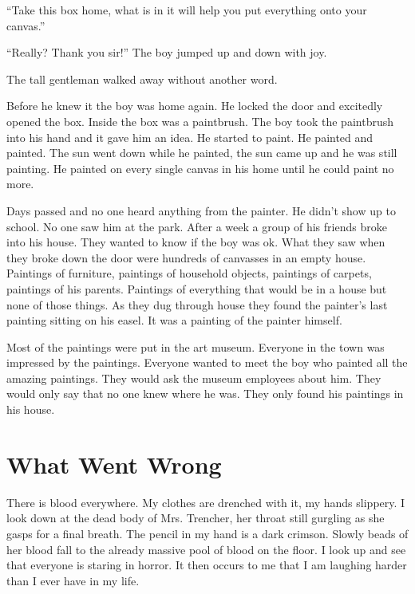 ``Take this box home, what is in it will help you put everything
onto your canvas.''

``Really? Thank you sir!'' The boy jumped up and down
with joy.

The tall gentleman walked away without another word.



Before he knew it the boy was home again. He locked the door and
excitedly opened the box. Inside the box was a paintbrush. The boy
took the paintbrush into his hand and it gave him an idea. He
started to paint. He painted and painted. The sun went down while
he painted, the sun came up and he was still painting. He painted
on every single canvas in his home until he could paint no
more.



Days passed and no one heard anything from the painter. He didn't
show up to school. No one saw him at the park. After a week a group
of his friends broke into his house. They wanted to know if the boy
was ok. What they saw when they broke down the door were hundreds
of canvasses in an empty house. Paintings of furniture, paintings
of household objects, paintings of carpets, paintings of his
parents. Paintings of everything that would be in a house but none
of those things. As they dug through house they found the painter's
last painting sitting on his easel. It was a painting of the
painter himself.



Most of the paintings were put in the art museum. Everyone in the
town was impressed by the paintings. Everyone wanted to meet the
boy who painted all the amazing paintings. They would ask the
museum employees about him. They would only say that no one knew
where he was. They only found his paintings in his house. 

 



\chapter{What Went Wrong}



There is blood everywhere. My clothes are drenched with it, my
hands slippery. I look down at the dead body of Mrs. Trencher, her
throat still gurgling as she gasps for a final breath. The pencil
in my hand is a dark crimson. Slowly beads of her blood fall to the
already massive pool of blood on the floor. I look up and see that
everyone is staring in horror. It then occurs to me that I am
laughing harder than I ever have in my life.

